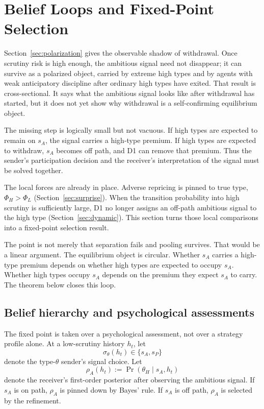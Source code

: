 
\section{Belief Loops and Fixed-Point Selection}
\label{sec:belief-loop}

Section~\ref{sec:polarization} gives the observable shadow of withdrawal. Once scrutiny risk is high enough, the ambitious signal need not disappear; it can survive as a polarized object, carried by extreme high types and by agents with weak anticipatory discipline after ordinary high types have exited. That result is cross-sectional. It says what the ambitious signal looks like after withdrawal has started, but it does not yet show why withdrawal is a self-confirming equilibrium object.

The missing step is logically small but not vacuous. If high types are expected to remain on \(s_A\), the signal carries a high-type premium. If high types are expected to withdraw, \(s_A\) becomes off path, and D1 can remove that premium. Thus the sender's participation decision and the receiver's interpretation of the signal must be solved together.

The local forces are already in place. Adverse repricing is pinned to true type, \(\Phi_H>\Phi_L\) (Section~\ref{sec:surprise}). When the transition probability into high scrutiny is sufficiently large, D1 no longer assigns an off-path ambitious signal to the high type (Section~\ref{sec:dynamic}). This section turns those local comparisons into a fixed-point selection result.

The point is not merely that separation fails and pooling survives. That would be a linear argument. The equilibrium object is circular. Whether \(s_A\) carries a high-type premium depends on whether high types are expected to occupy \(s_A\). Whether high types occupy \(s_A\) depends on the premium they expect \(s_A\) to carry. The theorem below closes this loop.

\subsection{Belief hierarchy and psychological assessments}
\label{subsec:belief-hierarchy}

The fixed point is taken over a psychological assessment, not over a strategy profile alone. At a low-scrutiny history \(h_t\), let
\[
\sigma_\theta(h_t)\in\{s_A,s_P\}
\]
denote the type-\(\theta\) sender's signal choice. Let
\[
\rho_A(h_t):=\Pr(\theta_H\mid s_A,h_t)
\]
denote the receiver's first-order posterior after observing the ambitious signal. If \(s_A\) is on path, \(\rho_A\) is pinned down by Bayes' rule. If \(s_A\) is off path, \(\rho_A\) is selected by the refinement.

